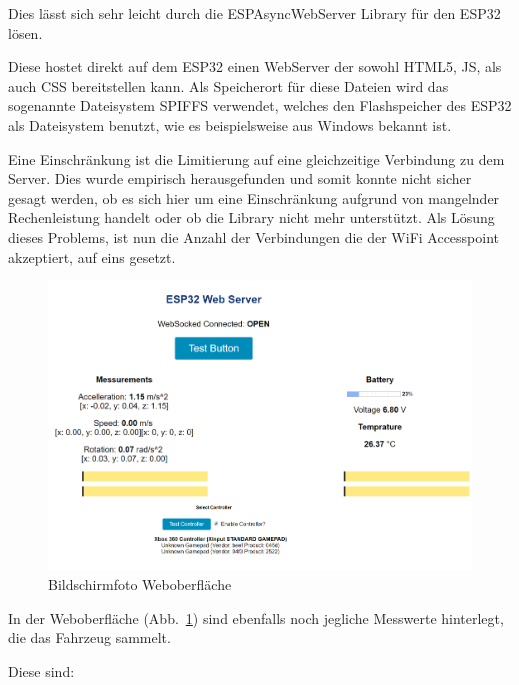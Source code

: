 \vspace{\baselineskip}
Dies lässt sich sehr leicht durch die ESPAsyncWebServer Library für den ESP32 lösen. \par

Diese hostet direkt auf dem ESP32 einen WebServer der sowohl HTML5, JS, als auch CSS bereitstellen kann. Als Speicherort für diese Dateien wird das sogenannte Dateisystem SPIFFS verwendet, welches den Flashspeicher des ESP32 als Dateisystem benutzt, wie es beispielsweise aus Windows bekannt ist.\par

Eine Einschränkung ist die Limitierung auf eine gleichzeitige Verbindung zu dem Server. Dies wurde empirisch herausgefunden und somit konnte nicht sicher gesagt werden, ob es sich hier um eine Einschränkung aufgrund von mangelnder Rechenleistung handelt oder ob die Library nicht mehr unterstützt. Als Lösung dieses Problems, ist nun die Anzahl der Verbindungen die der WiFi Accesspoint akzeptiert, auf eins gesetzt.\par


\vspace{\baselineskip}

\begin{figure}[!ht]
	\centering
	\includegraphics[width=\textwidth]{bilder/WebValues.png}
	\caption{Bildschirmfoto Weboberfläche}
	\label{bild:webvalues}
\end{figure}

In der Weboberfläche (Abb.~\ref{bild:webvalues}) sind ebenfalls noch jegliche Messwerte hinterlegt, die das Fahrzeug sammelt.\par

Diese sind:\par

